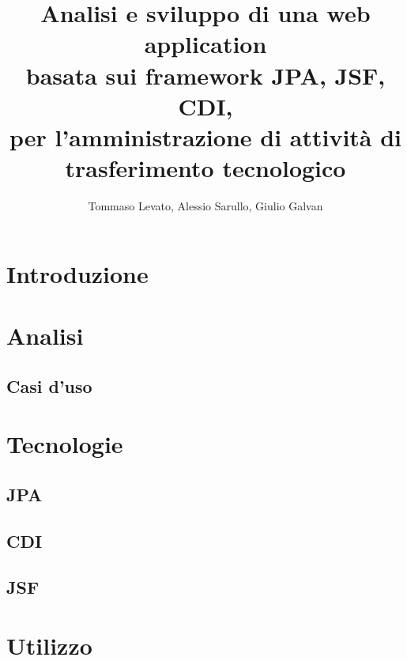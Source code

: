 \documentclass[a4paper,10pt]{report}
\title{Analisi e sviluppo di una web application \\
basata sui framework JPA, JSF, CDI, \\
per l'amministrazione di attività di trasferimento tecnologico}
\author{Tommaso Levato, Alessio Sarullo, Giulio Galvan}
\begin{document}
\maketitle


\begin{abstract}
\end{abstract}

\tableofcontents

\chapter{Introduzione}
\chapter{Analisi}
\section{Casi d'uso}

\chapter{Tecnologie}
\section{JPA}

\section{CDI}
\section{JSF}
\chapter{Utilizzo}
\end{document}
